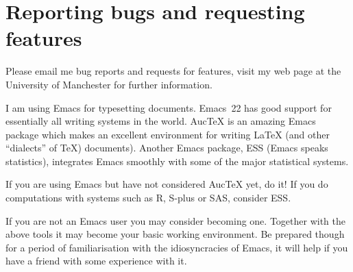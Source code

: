 \documentclass[12pt,a4paper,twosided]{article}
\begin{document}
% 

\section{Reporting bugs and requesting features} \label{sec:bugs}

Please email me bug reports and requests for features, visit my web page at the
University of Manchester for further information.

I am using Emacs for typesetting documents. Emacs~22 has good support for essentially all
writing systems in the world. AucTeX is an amazing Emacs package which makes an excellent
environment for writing  LaTeX (and other ``dialects'' of TeX) documents). 
Another Emacs package, ESS (Emacs speaks statistics), integrates Emacs smoothly with some of
the major statistical systems. 

If you are using Emacs but have not considered AucTeX yet, do it!
If you do computations with systems such as R, S-plus or SAS, consider ESS.

If you are not an Emacs user you may consider becoming one. Together with the above tools it
may become your basic working environment. Be prepared though for a period of familiarisation
with the idiosyncracies of Emacs, it will help if you have a friend with some experience with
it.   

 
\end{document}
